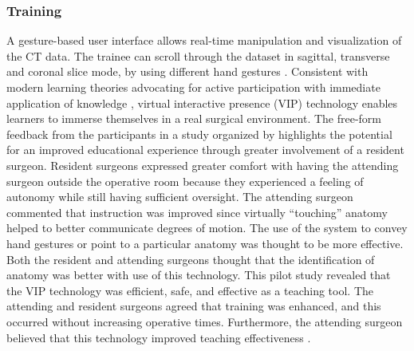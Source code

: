\subsubsection{Training}
A gesture-based user interface allows real-time manipulation and visualization of the CT data. The trainee can scroll through the dataset in sagittal, transverse and coronal slice mode, by using different hand gestures \cite{Kamphuis2014}.
Consistent with modern learning theories advocating for active participation with immediate application of knowledge \cite{Ponce2014}, virtual interactive presence (VIP) technology enables learners to immerse themselves in a real surgical environment. 
The free-form feedback from the participants in a study organized by \citet{Ponce2014} highlights the potential for an improved educational experience through greater involvement of a resident surgeon. Resident surgeons expressed greater comfort with having the attending surgeon outside the operative room because they experienced a feeling of autonomy while still having sufficient oversight. The attending surgeon commented that instruction was improved since virtually ``touching'' anatomy helped to better communicate degrees of motion. The use of the system to convey hand gestures or point to a particular anatomy was thought to be more effective. Both the resident and attending surgeons thought that the identification of anatomy was better with use of this technology. This pilot study revealed that the VIP technology was efficient, safe, and effective as a teaching tool. The attending and resident surgeons agreed that training was enhanced, and this occurred without increasing operative times. Furthermore, the attending surgeon believed that this technology improved teaching effectiveness \cite{Ponce2014}.

